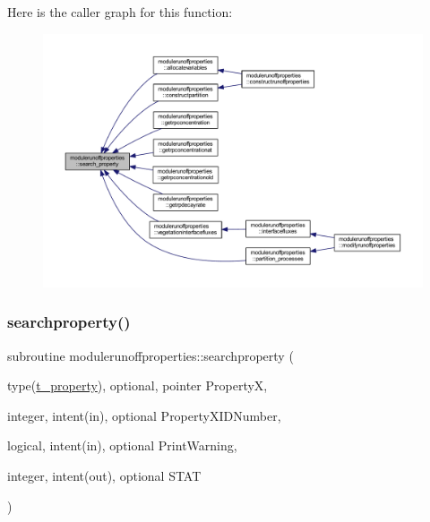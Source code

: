 Here is the caller graph for this function\+:\nopagebreak
\begin{figure}[H]
\begin{center}
\leavevmode
\includegraphics[width=350pt]{namespacemodulerunoffproperties_a13bbe5dac13800aec15511ca3b8b2a66_icgraph}
\end{center}
\end{figure}
\mbox{\label{namespacemodulerunoffproperties_ab2a49fca4ff961c8b2dfd016b005ed06}} 
\subsubsection{\texorpdfstring{searchproperty()}{searchproperty()}}
{\footnotesize\ttfamily subroutine modulerunoffproperties\+::searchproperty (\begin{DoxyParamCaption}\item[{type(\mbox{\hyperlink{structmodulerunoffproperties_1_1t__property}{t\+\_\+property}}), optional, pointer}]{PropertyX,  }\item[{integer, intent(in), optional}]{Property\+X\+I\+D\+Number,  }\item[{logical, intent(in), optional}]{Print\+Warning,  }\item[{integer, intent(out), optional}]{S\+T\+AT }\end{DoxyParamCaption})\hspace{0.3cm}{\ttfamily [private]}}

